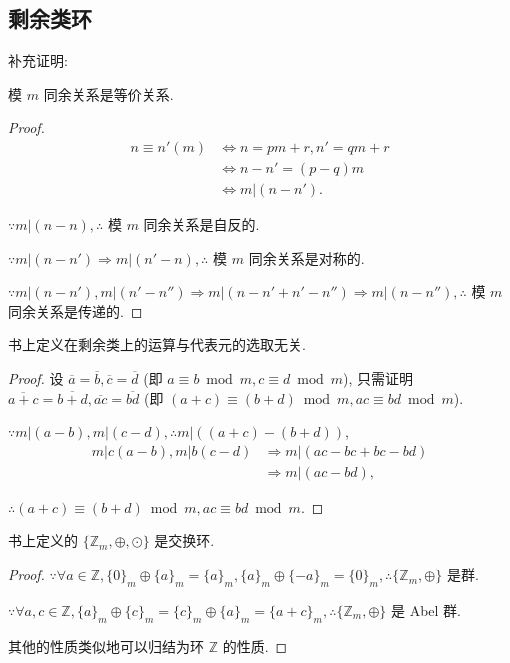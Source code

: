 \documentclass[color=black,device=normal,lang=cn,mode=geye]{elegantnote}
\begin{document}
\subsection{剩余类环}
补充证明:
\begin{theorem}
    模 $m$ 同余关系是等价关系.
\end{theorem}
\begin{proof}
    \begin{align*}
        n\equiv n'(m) & \Leftrightarrow n=pm+r,n'=qm+r \\
        & \Leftrightarrow n-n'=(p-q)m \\
        & \Leftrightarrow m|(n-n').
    \end{align*}

    $\because m|(n-n),\therefore$ 模 $m$ 同余关系是自反的.

    $\because m|(n-n')\Rightarrow m|(n'-n),\therefore$ 模 $m$ 同余关系是对称的.

    $\because m|(n-n'),m|(n'-n'')\Rightarrow m|(n-n'+n'-n'')\Rightarrow m|(n-n''),\therefore$ 模 $m$ 同余关系是传递的.
\end{proof}
\begin{theorem}
    书上定义在剩余类上的运算与代表元的选取无关.
\end{theorem}
\begin{proof}
    设 $\overline{a}=\overline{b},\overline{c}=\overline{d}$ (即 $a\equiv b\bmod m,c\equiv d\bmod m$), 只需证明 $\overline{a+c}=\overline{b+d},\overline{ac}=\overline{bd}$ (即 $(a+c)\equiv(b+d)\bmod m,ac\equiv bd\bmod m$).

    $\because m|(a-b),m|(c-d),\therefore m|((a+c)-(b+d))$,
    \begin{align*}
        m|c(a-b),m|b(c-d) & \Rightarrow m|(ac-bc+bc-bd) \\
        & \Rightarrow m|(ac-bd),
    \end{align*}

    $\therefore (a+c)\equiv(b+d)\bmod m,ac\equiv bd\bmod m$.
\end{proof}
\begin{theorem}
    书上定义的 $\{\mathbb{Z}_m,\oplus,\odot\}$ 是交换环.
\end{theorem}
\begin{proof}
    $\because\forall a\in\mathbb{Z},\{0\}_m\oplus\{a\}_m=\{a\}_m,\{a\}_m\oplus\{-a\}_m=\{0\}_m,\therefore\{\mathbb{Z}_m,\oplus\}$ 是群.

    $\because\forall a,c\in\mathbb{Z},\{a\}_m\oplus\{c\}_m=\{c\}_m\oplus\{a\}_m=\{a+c\}_m,\therefore\{\mathbb{Z}_m,\oplus\}$ 是 Abel 群.

    其他的性质类似地可以归结为环 $\mathbb{Z}$ 的性质.
\end{proof}
\end{document}

